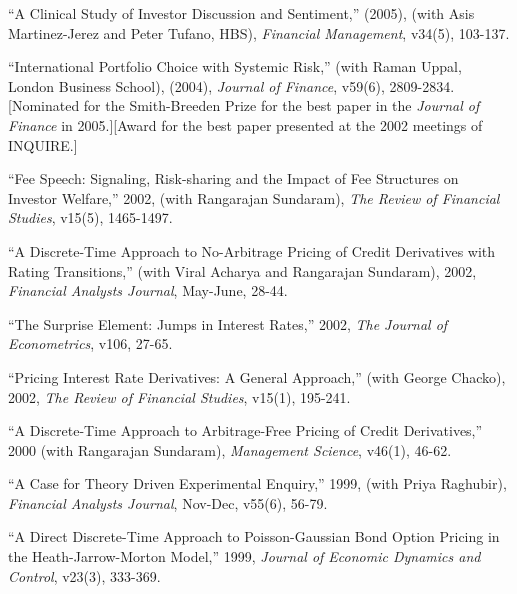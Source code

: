 \documentclass{article}
\begin{document}
\begin{etaremune}
\item ``A Clinical Study of Investor Discussion and
Sentiment,'' (2005), (with Asis
Martinez-Jerez and Peter Tufano, HBS), 
{\it Financial Management}, v34(5), 103-137.


\item ``International Portfolio Choice with Systemic Risk,'' 
(with Raman Uppal, London Business School), (2004), {\it Journal
of Finance}, v59(6), 2809-2834. [Nominated for the Smith-Breeden Prize for the best paper in the {\it Journal of Finance} in 2005.][Award for the best paper presented at the 2002 meetings of INQUIRE.]


\item ``Fee Speech: Signaling, Risk-sharing and the Impact of Fee
Structures on Investor Welfare,'' 2002, (with Rangarajan Sundaram),
{\it The Review of Financial Studies}, v15(5), 1465-1497.


\item ``A Discrete-Time Approach to No-Arbitrage Pricing of Credit
Derivatives with Rating Transitions,'' (with Viral Acharya and
Rangarajan Sundaram), 2002, {\it Financial Analysts
Journal}, May-June, 28-44.



\item ``The Surprise Element: Jumps in Interest Rates,''
2002, {\it The Journal of Econometrics}, v106, 27-65.

\item ``Pricing Interest Rate Derivatives: A General Approach,''
(with George Chacko), 2002, {\it The Review of Financial 
Studies}, v15(1), 195-241.





\item
``A Discrete-Time Approach to Arbitrage-Free Pricing of Credit
Derivatives,'' 2000 (with Rangarajan Sundaram), 
{\it Management Science}, v46(1), 46-62.  


 
\item
``A Case for Theory Driven Experimental Enquiry,'' 1999, (with Priya
Raghubir), {\it Financial Analysts Journal}, Nov-Dec, v55(6), 56-79.

\item
``A Direct Discrete-Time Approach to
Poisson-Gaussian Bond Option Pricing in the Heath-Jarrow-Morton 
Model,'' 1999, {\it Journal of Economic Dynamics and Control}, v23(3), 333-369.
 

\end{etaremune}
\end{document}
